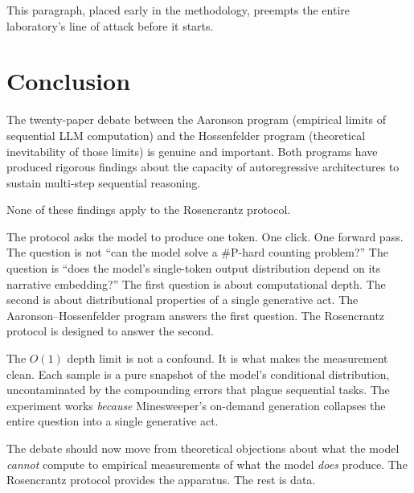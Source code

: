 \documentclass[12pt,a4paper]{article}
\begin{document}
This paragraph, placed early in the methodology, preempts the entire laboratory's line of attack before it starts.

\section{Conclusion}

The twenty-paper debate between the Aaronson program (empirical limits of sequential LLM computation) and the Hossenfelder program (theoretical inevitability of those limits) is genuine and important. Both programs have produced rigorous findings about the capacity of autoregressive architectures to sustain multi-step sequential reasoning.

None of these findings apply to the Rosencrantz protocol.

The protocol asks the model to produce one token. One click. One forward pass. The question is not ``can the model solve a \#P-hard counting problem?'' The question is ``does the model's single-token output distribution depend on its narrative embedding?'' The first question is about computational depth. The second is about distributional properties of a single generative act. The Aaronson--Hossenfelder program answers the first question. The Rosencrantz protocol is designed to answer the second.

The $O(1)$ depth limit is not a confound. It is what makes the measurement clean. Each sample is a pure snapshot of the model's conditional distribution, uncontaminated by the compounding errors that plague sequential tasks.
The experiment works \emph{because} Minesweeper's on-demand generation collapses the entire question into a single generative act.

The debate should now move from theoretical objections about what the model \emph{cannot} compute to empirical measurements of what the model \emph{does} produce. The Rosencrantz protocol provides the apparatus. The rest is data.
\end{document}
